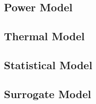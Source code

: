 \subsection{Power Model} 


\subsection{Thermal Model} 


\subsection{Statistical Model} 


\subsection{Surrogate Model} 


% 
